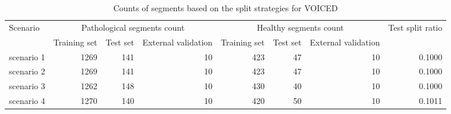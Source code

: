 \begin{table}
    \centering
    \begin{tabular}{lrrrrrrr}
        \toprule
        \multirow{2}{*}{Scenario} & \multicolumn{3}{c}{Pathological segments count} & \multicolumn{3}{c}{Healthy segments count} & \multirow{2}{*}{Test split ratio} \\
        & Training set & Test set & External validation & Training set & Test set & External validation & \\
        \midrule
            scenario 1 & 1269 & 141 & 10 & 423 & 47 & 10 & 0.1000 \\
			scenario 2 & 1269 & 141 & 10 & 423 & 47 & 10 & 0.1000 \\
			scenario 3 & 1262 & 148 & 10 & 430 & 40 & 10 & 0.1000 \\
			scenario 4 & 1270 & 140 & 10 & 420 & 50 & 10 & 0.1011 \\
        \bottomrule
    \end{tabular}
    \caption{Counts of segments based on the split strategies for VOICED}
    \label{tab:voiced_counts}
\end{table}